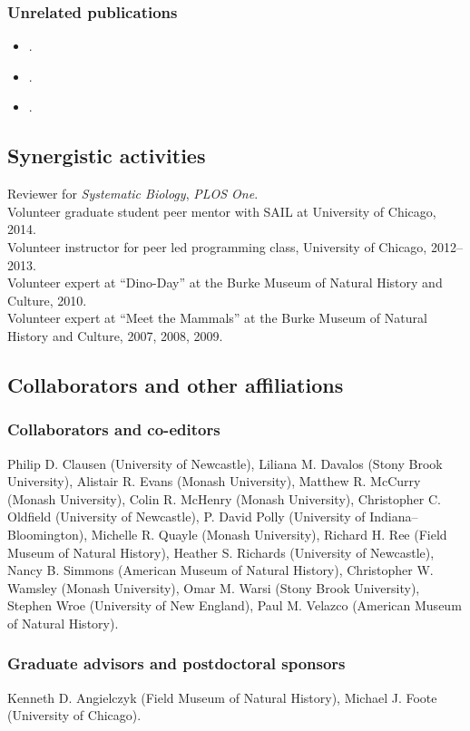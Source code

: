 \subsubsection{Unrelated publications}
\begin{itemize}
  \item {}. %
  \item {}. %
  \item {}.%
\end{itemize}

\subsection{Synergistic activities}
Reviewer for \textit{Systematic Biology}, \textit{PLOS One}.\\
Volunteer graduate student peer mentor with SAIL at University of Chicago, 2014.\\
Volunteer instructor for peer led programming class, University of Chicago, 2012--2013.\\
Volunteer expert at ``Dino-Day'' at the Burke Museum of Natural History and Culture, 2010. \\
Volunteer expert at ``Meet the Mammals'' at the Burke Museum of Natural History and Culture, 2007, 2008, 2009.

\subsection{Collaborators and other affiliations}
\subsubsection{Collaborators and co-editors}
Philip D. Clausen (University of Newcastle), Liliana M. Davalos (Stony Brook University), Alistair R. Evans (Monash University), Matthew R. McCurry (Monash University), Colin R. McHenry (Monash University), Christopher C. Oldfield (University of Newcastle), P. David Polly (University of Indiana--Bloomington), Michelle R. Quayle (Monash University), Richard H. Ree (Field Museum of Natural History), Heather S. Richards (University of Newcastle), Nancy B. Simmons (American Museum of Natural History), Christopher W. Wamsley (Monash University), Omar M. Warsi (Stony Brook University), Stephen Wroe (University of New England), Paul M. Velazco (American Museum of Natural History).

\subsubsection{Graduate advisors and postdoctoral sponsors}
Kenneth D. Angielczyk (Field Museum of Natural History), Michael J. Foote (University of Chicago).

